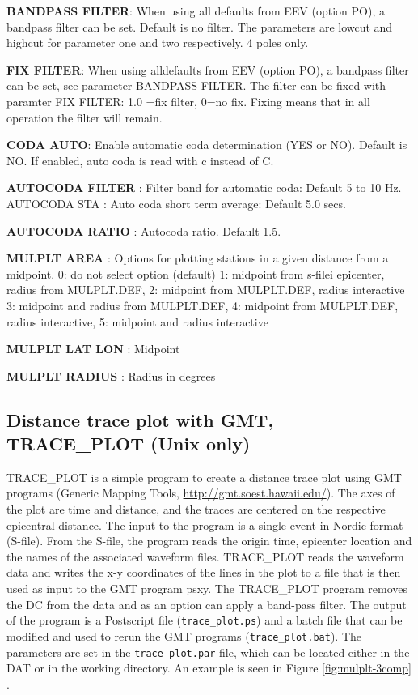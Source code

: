 \textbf{BANDPASS FILTER}: When using all 
defaults from EEV (option PO), a bandpass filter can be set. Default is no filter. The parameters are 
lowcut and highcut for parameter one and two respectively. 4 poles only. 

\textbf{FIX FILTER}: When using alldefaults from EEV (option PO), a bandpass filter can be set, see parameter BANDPASS FILTER. The filter can be fixed with paramter FIX FILTER: 1.0 =fix filter, 0=no fix. Fixing means that in all operation the filter will remain.

\textbf{CODA AUTO}: Enable automatic coda determination (YES or NO). Default is NO. If enabled, auto coda is read with c instead of C. 

\textbf{AUTOCODA FILTER }: Filter band for automatic coda: Default 5 to 10 Hz. AUTOCODA STA : Auto coda short term average: Default 5.0 secs. 

\textbf{AUTOCODA RATIO }: Autocoda ratio. Default 1.5.

\textbf{MULPLT AREA }: Options for plotting stations in a given distance from a midpoint. 0: do not select option (default) 1: midpoint from s-filei epicenter, radius from MULPLT.DEF,  2: midpoint from MULPLT.DEF, radius interactive  3: midpoint and radius from MULPLT.DEF, 4: midpoint from MULPLT.DEF, radius interactive, 5: midpoint and radius interactive 

\textbf{MULPLT LAT LON }: Midpoint 

\textbf{MULPLT RADIUS }: Radius in degrees 

\subsection{Distance trace plot with GMT, TRACE\_PLOT (Unix only)}
TRACE\_PLOT is a simple program to create a distance trace plot using GMT programs (Generic Mapping Tools, \url{http://gmt.soest.hawaii.edu/}). The axes of the plot are time and distance, and the traces are centered on the respective epicentral distance. The input to the program is a single event in Nordic format (S-file). From the S-file, the program reads the origin time, epicenter location and the names of the associated waveform files. TRACE\_PLOT reads the waveform data and writes the x-y coordinates of the lines in the plot to a file that is then used as input to the GMT program psxy. The TRACE\_PLOT program removes the DC from the data and as an option can apply a band-pass filter. The output of the program is a Postscript file (\texttt{trace\_plot.ps}) and a batch file that can be modified and used to rerun the GMT programs (\texttt{trace\_plot.bat}). The parameters are set in the \texttt{trace\_plot.par} file, which can be located either in the DAT or in the working directory. An example is seen in Figure 
\ref{fig:mulplt-3comp}
. 

